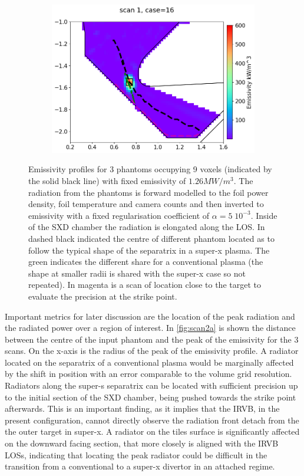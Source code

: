 \begin{figure}
\begin{subfigure}{0.33\linewidth}
         \centering
         \includegraphics[trim={0 0 0 35},clip,width=\textwidth]{Chapters/chapter2/figs/phantom_example3.png}
         \caption{}
         \label{fig:scan1c}
     \end{subfigure}
    \caption{Emissivity profiles for 3 phantoms occupying 9 voxels (indicated by the solid black line) with fixed emissivity of $1.26MW/m^3$. The radiation from the phantoms is forward modelled to the foil power density, foil temperature and camera counts and then inverted to emissivity with a fixed regularisation coefficient of $\alpha=5 \; 10^{-3}$. Inside of the SXD chamber the radiation is elongated along the LOS. In dashed black indicated the centre of different phantom located as to follow the typical shape of the separatrix in a super-x plasma. The green indicates the different share for a conventional plasma (the shape at smaller radii is shared with the super-x case so not repeated). In magenta is a scan of location close to the target to evaluate the precision at the strike point.}
    \label{fig:scan1}
\end{figure}

Important metrics for later discussion are the location of the peak radiation and the radiated power over a region of interest. In \autoref{fig:scan2a} is shown the distance between the centre of the input phantom and the peak of the emissivity for the 3 scans. On the x-axis is the radius of the peak of the emissivity profile. A radiator located on the separatrix of a conventional plasma would be marginally affected by the shift in position with an error comparable to the volume grid resolution. Radiators along the super-s separatrix can be located with sufficient precision up to the initial section of the SXD chamber, being pushed towards the strike point afterwards. This is an important finding, as it implies that the IRVB, in the present configuration, cannot directly observe the radiation front detach from the the outer target in super-x. A radiator on the tiles surface is significantly affected on the downward facing section, that more closely is aligned with the IRVB LOSs, indicating that locating the peak radiator could be difficult in the transition from a conventional to a super-x divertor in an attached regime.

